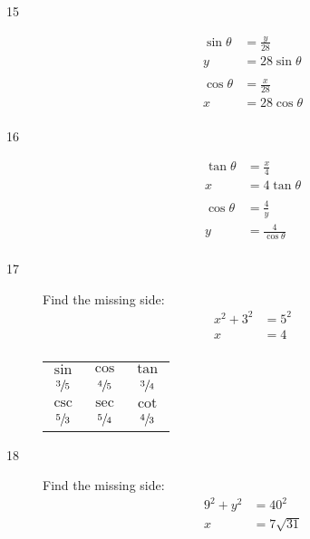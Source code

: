 \documentclass{exam}
\begin{document}
\begin{description}
      \item[15]
        \begin{align*}
          \sin \theta & = \frac{y}{28} \\
          y           & = \boxed{ 28 \sin \theta } \\
          \\
          \cos \theta & = \frac{x}{28} \\
          x           & = \boxed{ 28 \cos \theta } \\
        \end{align*}

      \item[16]
        \begin{align*}
          \tan \theta & = \frac{x}{4} \\
          x           & = \boxed{ 4 \tan \theta } \\
          \\
          \cos \theta & = \frac{4}{y} \\
          y           & = \boxed{ \frac{4}{\cos \theta} } \\
        \end{align*}

      \item[17] 
        Find the missing side:
        \begin{align*}
          x^2 + 3^2 & = 5^2 \\
          x         & = 4 \\
        \end{align*}

        \begin{tabular}[H]{ccc}
          \toprule

          $\sin$         & $\cos$         & $\tan$         \\
          $\sfrac{3}{5}$ & $\sfrac{4}{5}$ & $\sfrac{3}{4}$ \\

          \midrule

          $\csc$         & $\sec$         & $\cot$ \\
          $\sfrac{5}{3}$ & $\sfrac{5}{4}$ & $\sfrac{4}{3}$ \\

          \bottomrule
        \end{tabular}

      \item[18] 
        Find the missing side:
        \begin{align*}
          9^2 + y^2 & = 40^2 \\
          x         & = 7 \sqrt{31} \\
        \end{align*}


\end{description}
\end{document}
